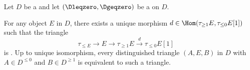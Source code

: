 \begin{proposition} \label{proposition:distinguished_triangles_for_t_structures_on_triangulated_categories_given_by_truncation_are_unique}
    Let $D$ be a  and let $(\Dleqzero, \Dgeqzero)$ be a  on $D$.

    For any object $E$ in $D$, there exists a unique morphism $d \in \Hom(\tau_{\geq 1} E, \tau_{\leq 0} E[1])$ such that the triangle
    $$\tau_{\leq E} \to E \to \tau_{\geq 1} E \xrightarrow{d} \tau_{\leq 0} E[1]$$
    is . Up to unique isomorphism, every distinguished triangle $(A,E,B)$ in $D$ with $A \in D^{\leq 0}$ and $B \in D^{\geq 1}$ is equivalent to such a triangle.
\end{proposition}